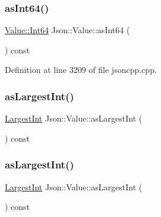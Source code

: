 \hypertarget{class_json_1_1_value_aa647ac4fe51a2e325c063ebe32262b44}{}\label{class_json_1_1_value_aa647ac4fe51a2e325c063ebe32262b44} 
\subsubsection{\texorpdfstring{as\+Int64()}{asInt64()}\hspace{0.1cm}{\footnotesize\ttfamily [2/2]}}
{\footnotesize\ttfamily \hyperlink{class_json_1_1_value_a1b86af9f85f0f1baa972c3319fa22695}{Value\+::\+Int64} Json\+::\+Value\+::as\+Int64 (\begin{DoxyParamCaption}{ }\end{DoxyParamCaption}) const}



Definition at line 3209 of file jsoncpp.\+cpp.

\hypertarget{class_json_1_1_value_ab16f2ea2a117a1b3b576acab8b6a700d}{}\label{class_json_1_1_value_ab16f2ea2a117a1b3b576acab8b6a700d} 
\subsubsection{\texorpdfstring{as\+Largest\+Int()}{asLargestInt()}\hspace{0.1cm}{\footnotesize\ttfamily [1/2]}}
{\footnotesize\ttfamily \hyperlink{class_json_1_1_value_a1cbb82642ed05109b9833e49f042ece7}{Largest\+Int} Json\+::\+Value\+::as\+Largest\+Int (\begin{DoxyParamCaption}{ }\end{DoxyParamCaption}) const}

\hypertarget{class_json_1_1_value_ab16f2ea2a117a1b3b576acab8b6a700d}{}\label{class_json_1_1_value_ab16f2ea2a117a1b3b576acab8b6a700d} 
\subsubsection{\texorpdfstring{as\+Largest\+Int()}{asLargestInt()}\hspace{0.1cm}{\footnotesize\ttfamily [2/2]}}
{\footnotesize\ttfamily \hyperlink{class_json_1_1_value_a1cbb82642ed05109b9833e49f042ece7}{Largest\+Int} Json\+::\+Value\+::as\+Largest\+Int (\begin{DoxyParamCaption}{ }\end{DoxyParamCaption}) const}



